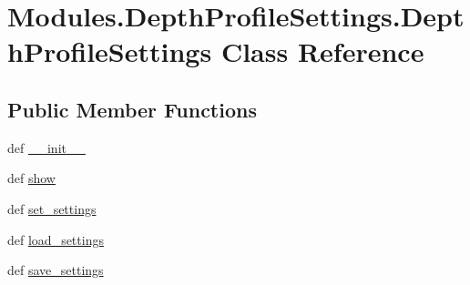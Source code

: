 \hypertarget{classModules_1_1DepthProfileSettings_1_1DepthProfileSettings}{\section{Modules.\-Depth\-Profile\-Settings.\-Depth\-Profile\-Settings Class Reference}
\label{classModules_1_1DepthProfileSettings_1_1DepthProfileSettings}
}
\subsection*{Public Member Functions}
\begin{DoxyCompactItemize}
\item 
def \hyperlink{classModules_1_1DepthProfileSettings_1_1DepthProfileSettings_a65f273bdb7d9184fd81a2838aa905d40}{\-\_\-\-\_\-init\-\_\-\-\_\-}
\item 
def \hyperlink{classModules_1_1DepthProfileSettings_1_1DepthProfileSettings_a750fe5ee358369650f1b1e2966168225}{show}
\item 
def \hyperlink{classModules_1_1DepthProfileSettings_1_1DepthProfileSettings_a076a13d49766fc146e7c23575e446a8f}{set\-\_\-settings}
\item 
def \hyperlink{classModules_1_1DepthProfileSettings_1_1DepthProfileSettings_a6a91db400bb429e91771092f88c96389}{load\-\_\-settings}
\item 
def \hyperlink{classModules_1_1DepthProfileSettings_1_1DepthProfileSettings_aa7d5e07e945a2902bf52976dacab77c0}{save\-\_\-settings}
\end{DoxyCompactItemize}
